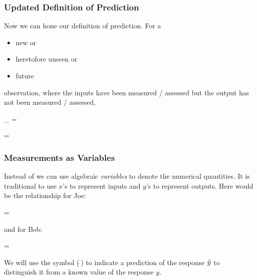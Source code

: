 \documentclass[slides]{beamer} %
\begin{document}
\begin{frame}\frametitle{Updated Definition of Prediction}

\small 
Now we can hone our definition of prediction. For a 

\begin{itemize}
\item new or
\item heretofore unseen or
\item future
\end{itemize}

observation, where the inputs have been measured / assessed but the output has not been measured / assessed,

\beqn
{}_{} = 
\eeqn

\tiny 
\beqn
{} = 
\eeqn
\normalsize


\end{frame}


\begin{frame}\frametitle{Measurements as Variables}

Instead of  we can use algebraic \textit{variables} to denote the numerical quantities. It is traditional to use $x$'s to represent inputs and $y$'s to represent outputs. Here would be the relationship for Joe:


\beqn
{} = 
\eeqn

and for Bob:


\beqn
{} = 
\eeqn

We will use the  symbol ($\hat{~}$) to indicate a prediction of the response $\hat{y}$ to distinguish it from a known value of the response $y$.

\end{frame}
\end{document}

